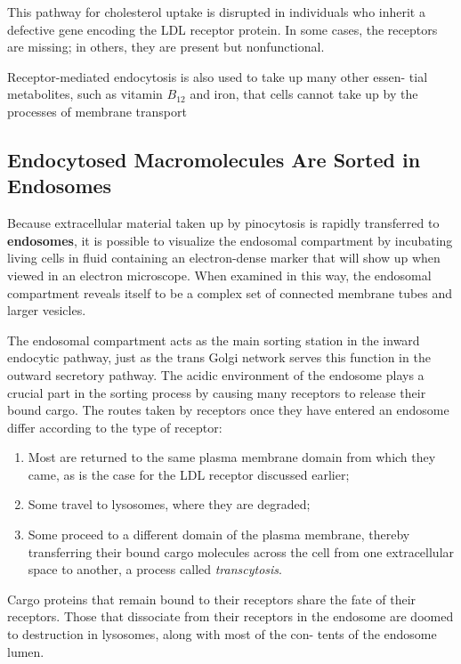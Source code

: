 This pathway for cholesterol uptake is disrupted in individuals who inherit
a defective gene encoding the LDL receptor protein. In some cases, the
receptors are missing; in others, they are present but nonfunctional.

Receptor-mediated endocytosis is also used to take up many other essen-
tial metabolites, such as vitamin $B_{12}$ and iron, that cells cannot take up
by the processes of membrane transport

\subsection{Endocytosed Macromolecules Are Sorted in Endosomes}

Because extracellular material taken up by pinocytosis is rapidly
transferred to \textbf{endosomes}, it is possible to visualize the endosomal compartment 
by incubating living cells in fluid containing an electron-dense
marker that will show up when viewed in an electron microscope. When
examined in this way, the endosomal compartment reveals itself to be
a complex set of connected membrane tubes and larger vesicles.

The endosomal compartment acts as the main sorting station in the
inward endocytic pathway, just as the trans Golgi network serves this
function in the outward secretory pathway. The acidic environment of
the endosome plays a crucial part in the sorting process by causing many
receptors to release their bound cargo. The routes taken by receptors once
they have entered an endosome differ according to the type of receptor:

\begin{enumerate}
\item Most are returned to the same plasma membrane domain from which
they came, as is the case for the LDL receptor discussed earlier; 
\item Some travel to lysosomes, where they are degraded; 
\item Some proceed to a different domain of the plasma membrane, thereby transferring their
bound cargo molecules across the cell from one extracellular space to
another, a process called \textit{transcytosis}.
\end{enumerate}

Cargo proteins that remain bound to their receptors share the fate of their
receptors. Those that dissociate from their receptors in the endosome
are doomed to destruction in lysosomes, along with most of the con-
tents of the endosome lumen.

